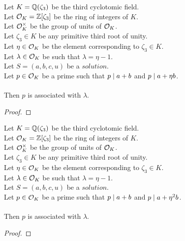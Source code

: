 \begin{lemma}
    \label{lmm:associated_of_dvd_a_add_b_of_dvd_a_add_eta_mul_b}
    \leanok
    Let $K = \mathbb{Q}(\zeta_3)$ be the third cyclotomic field. \\
    Let $\mathcal{O}_K = \mathbb{Z}[\zeta_3]$ be the ring of integers of $K$. \\
    Let $\mathcal{O}^\times_K$ be the group of units of $\mathcal{O}_K$. \\
    Let $\zeta_3 \in K$ be any primitive third root of unity. \\
    Let $\eta \in \mathcal{O}_K$ be the element corresponding to $\zeta_3 \in K$. \\
    Let $\lambda \in \mathcal{O}_K$ be such that $\lambda = \eta -1$. \\
    Let $S=(a, b, c, u)$ be a $solution$.\\
    Let $p \in \mathcal{O}_K$ be a prime such that $p \mid a+b$
    and $p \mid a+\eta  b$.\\\\
    Then $p$ is associated with $\lambda$.
\end{lemma}
\begin{proof}
    \leanok
\end{proof}

\begin{lemma}
    \label{lmm:associated_of_dvd_a_add_b_of_dvd_a_add_eta_sq_mul_b}
    \leanok
    Let $K = \mathbb{Q}(\zeta_3)$ be the third cyclotomic field. \\
    Let $\mathcal{O}_K = \mathbb{Z}[\zeta_3]$ be the ring of integers of $K$. \\
    Let $\mathcal{O}^\times_K$ be the group of units of $\mathcal{O}_K$. \\
    Let $\zeta_3 \in K$ be any primitive third root of unity. \\
    Let $\eta \in \mathcal{O}_K$ be the element corresponding to $\zeta_3 \in K$. \\
    Let $\lambda \in \mathcal{O}_K$ be such that $\lambda = \eta -1$. \\
    Let $S=(a, b, c, u)$ be a $solution$.\\
    Let $p \in \mathcal{O}_K$ be a prime such that $p \mid a+b$
    and $p \mid a+\eta^2  b$.\\\\
    Then $p$ is associated with $\lambda$.
\end{lemma}
\begin{proof}
    \leanok
\end{proof}

